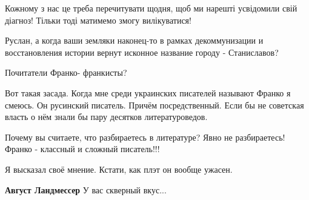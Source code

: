 \begin{itemize}
 
Кожному з нас це треба перечитувати щодня, щоб ми нарешті усвідомили свій діагноз! Тільки тоді матимемо змогу вилікуватися!

 

Руслан, а когда ваши земляки наконец-то в рамках декоммунизации и
восстановления истории вернут исконное название городу - Станиславов? \Smiley[1.0][yellow]


 
Почитатели Франко- франкисты?

 

Вот такая засада. Когда мне среди украинских писателей называют Франко я
смеюсь. Он русинский писатель. Причём посредственный. Если бы не советская
власть о нём знали бы пару десятков литературоведов.

\begin{itemize}
 
Почему вы считаете, что разбираетесь в литературе? Явно не разбираетесь! Франко - классный и сложный писатель!!!

 
Я высказал своё мнение. Кстати, как плэт он вообще ужасен.

 
\textbf{Август Ландмессер} У вас скверный вкус...
\end{itemize}

\end{itemize}

